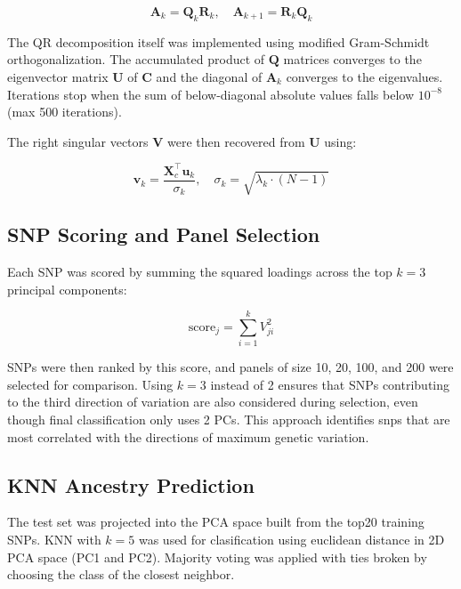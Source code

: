 \documentclass[conference]{IEEEtran}
\begin{document}
\begin{equation}
\mathbf{A}_k = \mathbf{Q}_k \mathbf{R}_k, \quad \mathbf{A}_{k+1} = \mathbf{R}_k \mathbf{Q}_k
\end{equation}

The QR decomposition itself was implemented using modified Gram-Schmidt orthogonalization. The accumulated product of $\mathbf{Q}$ matrices converges to the eigenvector matrix $\mathbf{U}$ of $\mathbf{C}$ and the diagonal of $\mathbf{A}_k$ converges to the eigenvalues. Iterations stop when the sum of below-diagonal absolute values falls below $10^{-8}$ (max 500 iterations).

The right singular vectors $\mathbf{V}$ were then recovered from $\mathbf{U}$ using:

\begin{equation}
\mathbf{v}_k = \frac{\mathbf{X}_c^\top \mathbf{u}_k}{\sigma_k}, \quad \sigma_k = \sqrt{\lambda_k \cdot (N-1)}
\end{equation}

\subsection{SNP Scoring and Panel Selection}

Each SNP was scored by summing the squared loadings across the top $k{=}3$ principal components:

\begin{equation}
\text{score}_j = \sum_{i=1}^{k} V_{ji}^2
\end{equation}

SNPs were then ranked by this score, and panels of size 10, 20, 100, and 200 were selected for comparison. Using $k{=}3$ instead of 2 ensures that SNPs contributing to the third direction of variation are also considered during selection, even though final classification only uses 2 PCs. This approach identifies snps that are most correlated with the directions of maximum genetic variation.

\subsection{KNN Ancestry Prediction}

The test set was projected into the PCA space built from the top20 training SNPs. KNN with $k{=}5$ was used for clasification using euclidean distance in 2D PCA space (PC1 and PC2). Majority voting was applied with ties broken by choosing the class of the closest neighbor.
\end{document}
